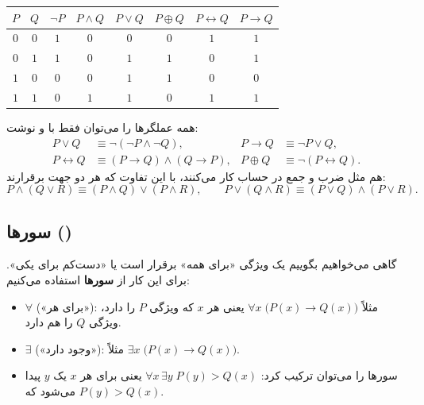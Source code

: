 \begin{ltrfig}
\renewcommand{\arraystretch}{1.15}
\begin{tabular}{cc|cccccc}
\toprule
$P$ & $Q$ & $\neg P$ & $P\wedge Q$ & $P\vee Q$ & $P\oplus Q$ & $P\leftrightarrow Q$ & $P\rightarrow Q$\\
\midrule
$0$ & $0$ & $1$ & $0$ & $0$ & $0$ & $1$ & $1$\\
$0$ & $1$ & $1$ & $0$ & $1$ & $1$ & $0$ & $1$\\
$1$ & $0$ & $0$ & $0$ & $1$ & $1$ & $0$ & $0$\\
$1$ & $1$ & $0$ & $1$ & $1$ & $0$ & $1$ & $1$\\
\bottomrule
\end{tabular}
\end{ltrfig}

همه عملگرها را می‌توان فقط با  و  نوشت:
\begin{align*}
P\vee Q&\equiv\neg(\neg P\wedge\neg Q), & P\rightarrow Q&\equiv\neg P\vee Q,\\
P\leftrightarrow Q&\equiv(P\rightarrow Q)\wedge(Q\rightarrow P), & P\oplus Q&\equiv\neg(P\leftrightarrow Q).
\end{align*}
 هم مثل ضرب و جمع در حساب کار می‌کنند، با این تفاوت که هر دو جهت برقرارند:
\[
P\wedge(Q\vee R)\equiv(P\wedge Q)\vee(P\wedge R),\qquad
P\vee(Q\wedge R)\equiv(P\vee Q)\wedge(P\vee R).
\]

\subsection{سورها ()}
گاهی می‌خواهیم بگوییم یک ویژگی «برای همه» برقرار است یا «دست‌کم برای یکی». برای این کار از \textbf{سورها} استفاده می‌کنیم:
\begin{itemize}
\item {} $\forall$ («برای هر»): مثلاً $\forall x\; \big(P(x)\rightarrow Q(x)\big)$ یعنی هر $x$ که ویژگی $P$ را دارد، ویژگی $Q$ را هم دارد.
\item {} $\exists$ («وجود دارد»): مثلاً $\exists x\; \big(P(x)\rightarrow Q(x)\big)$.
\item سورها را می‌توان ترکیب کرد: $\forall x\,\exists y\; P(y)>Q(x)$ یعنی برای هر $x$ یک $y$ پیدا می‌شود که $P(y)>Q(x)$.
\end{itemize}

